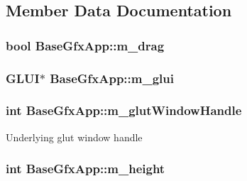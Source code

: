 \subsection{Member Data Documentation}
\hypertarget{classBaseGfxApp_a2e70a389224f8affe7c137f7e20dc8c1}{
\subsubsection[{m\-\_\-drag}]{\setlength{\rightskip}{0pt plus 5cm}bool Base\-Gfx\-App\-::m\-\_\-drag\hspace{0.3cm}{\ttfamily [protected]}}}\label{classBaseGfxApp_a2e70a389224f8affe7c137f7e20dc8c1}
\hypertarget{classBaseGfxApp_a6eb1673b80283727221da2242211af1d}{
\subsubsection[{m\-\_\-glui}]{\setlength{\rightskip}{0pt plus 5cm}G\-L\-U\-I$\ast$ Base\-Gfx\-App\-::m\-\_\-glui\hspace{0.3cm}{\ttfamily [protected]}}}\label{classBaseGfxApp_a6eb1673b80283727221da2242211af1d}
\hypertarget{classBaseGfxApp_ad8697d6fdd10e6f336c3a662016b4fa7}{
\subsubsection[{m\-\_\-glut\-Window\-Handle}]{\setlength{\rightskip}{0pt plus 5cm}int Base\-Gfx\-App\-::m\-\_\-glut\-Window\-Handle\hspace{0.3cm}{\ttfamily [protected]}}}\label{classBaseGfxApp_ad8697d6fdd10e6f336c3a662016b4fa7}
Underlying glut window handle \hypertarget{classBaseGfxApp_ac078e4fc20b5c2fe0c744966b850b412}{
\subsubsection[{m\-\_\-height}]{\setlength{\rightskip}{0pt plus 5cm}int Base\-Gfx\-App\-::m\-\_\-height\hspace{0.3cm}{\ttfamily [protected]}}}\label{classBaseGfxApp_ac078e4fc20b5c2fe0c744966b850b412}
